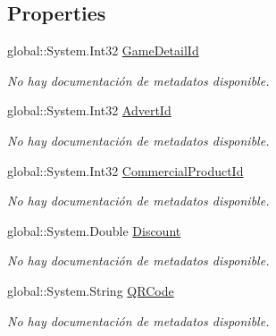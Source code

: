 \subsection*{Properties}
\begin{DoxyCompactItemize}
\item 
global\-::\-System.\-Int32 \hyperlink{class_game_memory_1_1_game_details_a18b899c092c351ffb5c98850b8d82103}{Game\-Detail\-Id}
\begin{DoxyCompactList}\small\item\em No hay documentación de metadatos disponible. \end{DoxyCompactList}\item 
global\-::\-System.\-Int32 \hyperlink{class_game_memory_1_1_game_details_ac1f85d6ae095d852885d3fd88a181106}{Advert\-Id}
\begin{DoxyCompactList}\small\item\em No hay documentación de metadatos disponible. \end{DoxyCompactList}\item 
global\-::\-System.\-Int32 \hyperlink{class_game_memory_1_1_game_details_a6fdd6c1a3a329df953a5c54a05c260b9}{Commercial\-Product\-Id}
\begin{DoxyCompactList}\small\item\em No hay documentación de metadatos disponible. \end{DoxyCompactList}\item 
global\-::\-System.\-Double \hyperlink{class_game_memory_1_1_game_details_a1752c3c4d5f63161c372ae8c9742f7fb}{Discount}
\begin{DoxyCompactList}\small\item\em No hay documentación de metadatos disponible. \end{DoxyCompactList}\item 
global\-::\-System.\-String \hyperlink{class_game_memory_1_1_game_details_ae5cc5d9b422f78685cd588225e4036ac}{Q\-R\-Code}
\begin{DoxyCompactList}\small\item\em No hay documentación de metadatos disponible. \end{DoxyCompactList}\item 

\end{DoxyCompactItemize}

